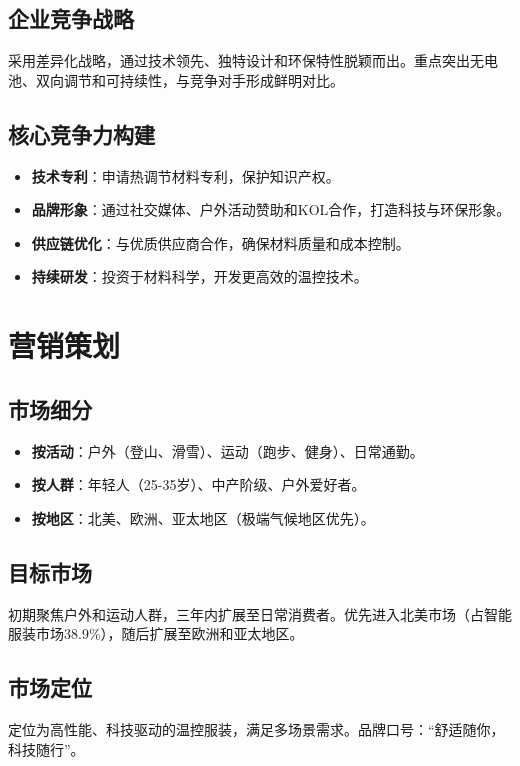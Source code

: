 \documentclass[UTF8]{report}
\theoremstyle{MyLineTheoremStyle} %
\theoremstyle{MyBlockTheoremStyle} %
\theoremstyle{MySubsubsectionStyle} %
\begin{document}
\section{企业竞争战略}
采用差异化战略，通过技术领先、独特设计和环保特性脱颖而出。重点突出无电池、双向调节和可持续性，与竞争对手形成鲜明对比。

\section{核心竞争力构建}
\begin{itemize}
    \item \textbf{技术专利}：申请热调节材料专利，保护知识产权。
    \item \textbf{品牌形象}：通过社交媒体、户外活动赞助和KOL合作，打造科技与环保形象。
    \item \textbf{供应链优化}：与优质供应商合作，确保材料质量和成本控制。
    \item \textbf{持续研发}：投资于材料科学，开发更高效的温控技术。
\end{itemize}

\chapter{营销策划}
\section{市场细分}
\begin{itemize}
    \item \textbf{按活动}：户外（登山、滑雪）、运动（跑步、健身）、日常通勤。
    \item \textbf{按人群}：年轻人（25-35岁）、中产阶级、户外爱好者。
    \item \textbf{按地区}：北美、欧洲、亚太地区（极端气候地区优先）。
\end{itemize}

\section{目标市场}
初期聚焦户外和运动人群，三年内扩展至日常消费者。优先进入北美市场（占智能服装市场38.9\%），随后扩展至欧洲和亚太地区。

\section{市场定位}
定位为高性能、科技驱动的温控服装，满足多场景需求。品牌口号：“舒适随你，科技随行”。
\end{document}
